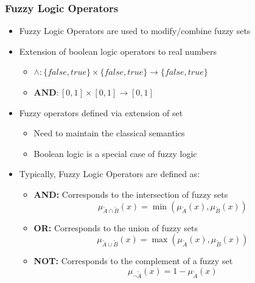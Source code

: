 \documentclass[
	10pt,
	t		%
]{beamer}
\begin{document}
\begin{frame}
	\frametitle{Fuzzy Logic Operators}
	\begin{itemize}
		\item Fuzzy Logic Operators are used to modify/combine fuzzy sets
		\item Extension of boolean logic operators to real numbers
		      \begin{itemize}
			      \item $\wedge : \{false, true\} \times \{false, true\} \rightarrow \{false, true\}$
			      \item $\textbf{AND} : [0,1] \times [0,1] \rightarrow [0,1]$
		      \end{itemize}
		\item Fuzzy operators defined via extension of set
		      \begin{itemize}
			      \item Need to maintain the classical semantics
			      \item Boolean logic is a special case of fuzzy logic
		      \end{itemize}

		\item Typically, Fuzzy Logic Operators are defined as:
		      \begin{itemize}
			      \item \textbf{AND:} Corresponds to the intersection of fuzzy sets
			            \[ \mu_{\tilde{A} \cap \tilde{B}}(x) = \min(\mu_{\tilde{A}}(x), \mu_{\tilde{B}}(x)) \]
			      \item \textbf{OR:} Corresponds to the union of fuzzy sets
			            \[ \mu_{\tilde{A} \cup \tilde{B}}(x) = \max(\mu_{\tilde{A}}(x), \mu_{\tilde{B}}(x)) \]
			      \item \textbf{NOT:} Corresponds to the complement of a fuzzy set
			            \[ \mu_{\neg \tilde{A}}(x) = 1 - \mu_{\tilde{A}}(x) \]

		      \end{itemize}
	\end{itemize}
\end{frame}
\end{document}

